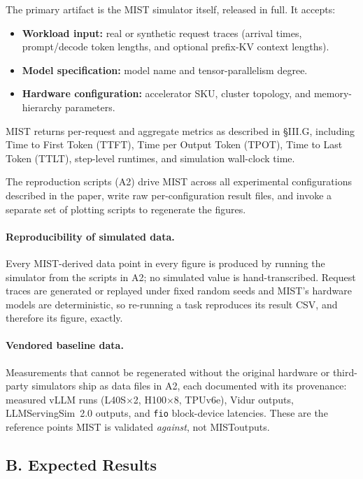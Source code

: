 \documentclass[conference]{IEEEtran}
\newcommand{\tool}{{MIST }}
\newcommand{\toolns}{{MIST}}
\begin{document}
The primary artifact is the \tool simulator itself, released in full.
It accepts:
\begin{itemize}[leftmargin=1.2em]
  \item \textbf{Workload input:} real or synthetic request traces
        (arrival times, prompt/decode token lengths, and optional
        prefix-KV context lengths).
  \item \textbf{Model specification:} model name and tensor-parallelism
        degree.
  \item \textbf{Hardware configuration:} accelerator SKU, cluster
        topology, and memory-hierarchy parameters.
\end{itemize}
\tool returns per-request and aggregate metrics as described in
\S III.G, including Time to First Token (TTFT), Time per Output Token
(TPOT), Time to Last Token (TTLT), step-level runtimes, and simulation
wall-clock time.

The reproduction scripts (A2) drive \tool across all experimental
configurations described in the paper, write raw per-configuration
result files, and invoke a separate set of plotting scripts to
regenerate the figures.

\paragraph{Reproducibility of simulated data.}
Every \toolns-derived data point in every figure is produced by running
the simulator from the scripts in A2; no simulated value is
hand-transcribed.  Request traces are generated or replayed under fixed
random seeds and \toolns's hardware models are deterministic, so
re-running a task reproduces its result CSV, and therefore its figure,
exactly.

\paragraph{Vendored baseline data.}
Measurements that cannot be regenerated without the original hardware or
third-party simulators ship as data files in A2, each documented with its
provenance: measured vLLM runs (L40S$\times$2, H100$\times$8, TPUv6e),
Vidur outputs, LLMServingSim~2.0 outputs, and \texttt{fio} block-device
latencies.  These are the reference points \tool is validated
\emph{against}, not \toolns outputs.

\subsection*{B. Expected Results}
\end{document}
